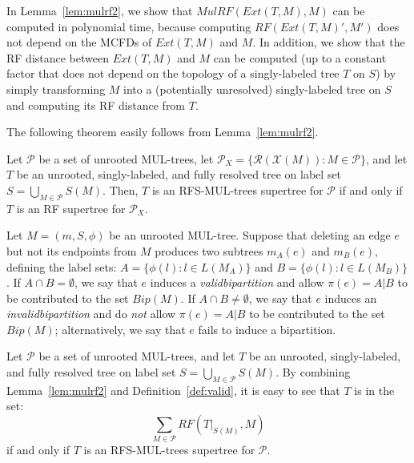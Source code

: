 In Lemma~\ref{lem:mulrf2}, we show that $MulRF(Ext(T,M),M)$ can be computed in polynomial time, because computing $RF(Ext(T,M)',M')$ does not depend on the MCFDs of $Ext(T,M)$ and $M$. 
In addition, we show that the RF distance between $Ext(T,M)$ and $M$ can be computed (up to a constant factor that does not depend on the topology of a singly-labeled tree $T$ on $S$) by simply transforming $M$ into a (potentially \gls{unresolved}) singly-labeled tree on $S$ and computing its RF distance from $T$.

The following theorem easily follows from Lemma~\ref{lem:mulrf2}.

\begin{theorem}
\label{thm:equal}
Let $\mathcal{P}$ be a set of unrooted MUL-trees, let $\mathcal{P}_X = \{ \mathcal{R}(\mathcal{X}(M)) : M \in \mathcal{P} \}$, and let $T$ be an unrooted, singly-labeled, and fully resolved tree on label set $S = \bigcup_{M \in \mathcal{P}} S(M)$.
Then, $T$ is an RFS-MUL-trees supertree for $\mathcal{P}$ if and only if $T$ is an RF supertree for $\mathcal{P}_X$.
\end{theorem}

\begin{definition}
\label{def:valid}
Let $M = (m, S, \phi)$ be an unrooted MUL-tree.
Suppose that deleting an edge $e$ but not its endpoints from $M$ produces two subtrees $m_A(e)$ and $m_B(e)$, defining the label sets: $A  = \{ \phi(l) : l \in L(M_A) \}$ and $B = \{ \phi(l) : l \in L(M_B) \}$.
If $A\cap B = \emptyset$, we say that $e$ induces a \emph{\gls{validbipartition}} and allow $\pi(e) = A|B$ to be contributed to the set $Bip(M)$.
If $A \cap B \ne \emptyset$, we say that $e$ induces an \emph{\gls{invalidbipartition}} and do \emph{not} allow $\pi(e) = A|B$ to be contributed to the set $Bip(M)$; alternatively, we say that $e$ fails to induce a bipartition.
\end{definition}

\begin{theorem}
\label{thm:equal-2}
Let $\mathcal{P}$ be a set of unrooted MUL-trees, and let $T$ be an unrooted, singly-labeled, and fully resolved tree on label set $S = \bigcup_{M \in \mathcal{P}} S(M)$.
By combining Lemma~\ref{lem:mulrf2} and Definition~\ref{def:valid}, it is easy to see that $T$ is in the set:
\begin{equation}
	 \sum_{M \in \mathcal{P}} RF(T|_{S(M)}, M)
\end{equation}
if and only if $T$ is an RFS-MUL-trees supertree for $\mathcal{P}$.
\end{theorem}

